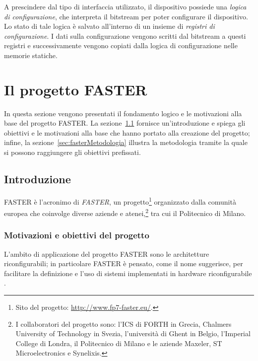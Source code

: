 A prescindere dal tipo di interfaccia utilizzato, il dispositivo possiede una
\emph{logica di configurazione}, che interpreta il bitstream per poter configurare
il dispositivo. Lo stato di tale logica è salvato all'interno di un insieme di \emph{registri di configurazione}.
I dati sulla configurazione vengono scritti dal bitstream a questi registri e successivamente
vengono copiati dalla logica di configurazione nelle memorie statiche.


\section[Il progetto \acs{FASTER}]{Il progetto \acs{FASTER}}
\label{sec:progettoFASTER}
In questa sezione vengono presentati il fondamento logico e le motivazioni alla 
base del progetto \acs{FASTER}. La sezione~\ref{subsec:fasterIntro} fornisce 
un'introduzione e spiega gli obiettivi e le motivazioni alla 
base che hanno portato alla creazione del progetto; infine, la
sezione~\ref{sec:fasterMetodologia} illustra la metodologia tramite la quale si possono 
raggiungere gli obiettivi prefissati.




\subsection{Introduzione}
\label{subsec:fasterIntro}
\acs{FASTER} è l'acronimo di \emph{\acl{FASTER}}, un progetto\footnote{Sito del 
progetto: \url{http://www.fp7-faster.eu/}.} organizzato dalla comunità europea 
che coinvolge diverse aziende e atenei,\footnote{I collaboratori del progetto 
sono: l'\ac{ICS} di \ac{FORTH} in Grecia, Chalmers University of Technology in 
Svezia, l'università di Ghent in Belgio, l'Imperial College di Londra, il 
Politecnico di Milano e le aziende Maxeler, ST Microelectronics e Synelixis.} 
tra cui il Politecnico di Milano.

\subsubsection{Motivazioni e obiettivi del progetto}
L'ambito di applicazione del progetto \ac{FASTER} sono le architetture 
riconfigurabili; in particolare \ac{FASTER} è pensato, come il nome 
suggerisce, per facilitare la definizione e l'uso di sistemi implementati in 
hardware riconfigurabile \cite{FasterPaper}.

